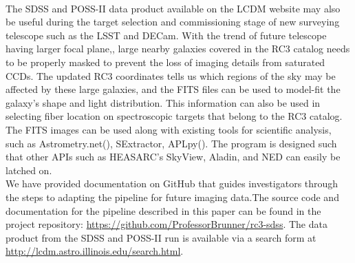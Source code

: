 \documentclass[5p]{elsarticle}
\begin{document}
\\
\indent The SDSS and POSS-II data product available on the LCDM website may also be useful  during  the target selection and commissioning stage of new surveying telescope such as the LSST and DECam. With the trend of future telescope having larger focal plane,, large nearby galaxies covered in the RC3 catalog needs to be properly masked to prevent the loss of imaging details from saturated CCDs. The updated RC3 coordinates tells us  which regions of the sky may be affected by these large galaxies, and the FITS files can be used to model-fit the galaxy's shape and light distribution. This information can also be used in selecting fiber location on spectroscopic targets that belong to the RC3 catalog. The FITS images can be used along with existing tools for scientific analysis, such as Astrometry.net(\citealp{astrometry.net}), SExtractor, APLpy(\citealp{aplpy}). The program is designed such that other APIs such as HEASARC's SkyView, Aladin, and NED can easily be latched on.
\\
\indent We have provided documentation on GitHub  that guides investigators through the steps to adapting the pipeline for future imaging data.The source code and documentation for the pipeline described in this paper can be found in the project repository: \url{https://github.com/ProfessorBrunner/rc3-sdss}. The data product from the SDSS and POSS-II run is available via a search form at \url{http://lcdm.astro.illinois.edu/search.html}.
\end{document}
